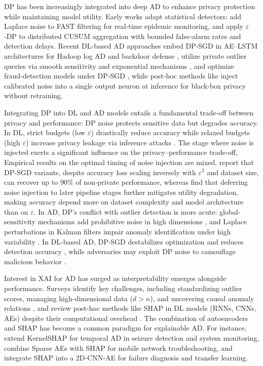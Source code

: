 DP has been increasingly integrated into deep AD to enhance privacy protection while maintaining model utility. Early works adapt statistical detectors: \cite{fan2013differentially} add Laplace noise to FAST filtering for real‑time epidemic monitoring, and \cite{kurt2022online} apply $\varepsilon$‑DP to distributed CUSUM aggregation with bounded false‑alarm rates and detection delays. Recent DL‑based AD approaches embed DP‑SGD in AE–LSTM architectures for Hadoop log AD and backdoor defense \citep{du2019robust}, utilize private outlier queries via smooth sensitivity and exponential mechanisms \citep{okada2015differentially}, and optimize fraud‑detection models under DP‑SGD \citep{wang2018privacy}, while post‑hoc methods like \citep{lu2022differentially} inject calibrated noise into a single output neuron at inference for black‑box privacy without retraining.

Integrating DP into DL and AD models entails a fundamental trade‑off between privacy and performance: DP noise protects sensitive data but degrades accuracy. In DL, strict budgets (low $\varepsilon$) drastically reduce accuracy while relaxed budgets (high $\varepsilon$) increase privacy leakage via inference attacks \citep{jayaraman2019evaluating}. The stage where noise is injected exerts a significant influence on the privacy–performance trade‑off, Empirical results on the optimal timing of noise injection are mixed. \cite{wu2020value} report that DP‑SGD variants, despite accuracy loss scaling inversely with $\varepsilon^2$ and dataset size, can recover up to 90\% of non‑private performance, whereas \cite{zhao2020not} find that deferring noise injection to later pipeline stages further mitigates utility degradation, making accuracy depend more on dataset complexity and model architecture than on $\varepsilon$. In AD, DP’s conflict with outlier detection is more acute: global-sensitivity mechanisms add prohibitive noise in high dimensions \citep{okada2015differentially}, and Laplace perturbations in Kalman filters impair anomaly identification under high variability \citep{fan2013differentially,kurt2022online}. In DL‑based AD, DP‑SGD destabilizes optimization and reduces detection accuracy \citep{wang2018privacy,du2019robust}, while adversaries may exploit DP noise to camouflage malicious behavior \citep{giraldo2020adversarial}.

Interest in XAI for AD has surged as interpretability emerges alongside performance. Surveys identify key challenges, including standardizing outlier scores, managing high-dimensional data ($d>n$), and uncovering causal anomaly relations \citep{panjei2022survey}, and review post-hoc methods like SHAP in DL models (RNNs, CNNs, AEs) despite their computational overhead \citep{li2023survey}. The combination of autoencoders and SHAP has become a common paradigm for explainable AD. For instance, \cite{giurgiu2019additive} extend KernelSHAP for temporal AD in seizure detection and system monitoring, \cite{chawla2020interpretable} combine Sparse AEs with SHAP for mobile network troubleshooting, and \cite{serradilla2021adaptable} integrate SHAP into a 2D‑CNN‑AE for failure diagnosis and transfer learning.

